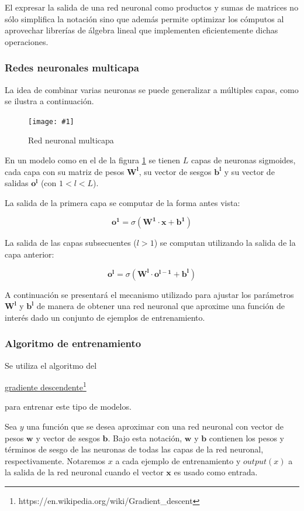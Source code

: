 \documentclass[a4paper, 10pt, twoside]{article}
\newcommand{\img}[3]{
  \begin{figure}[H]
    \begin{center}
      \texttt{[image: \#1]}
    \end{center}
    \caption{#2}
    \label{#3}
  \end{figure}
}
\newcommand{\link}[2]{
  \href{#1}{#2}\footnote{#1}
}
\begin{document}
El expresar la salida de una red neuronal como productos y sumas de matrices no
sólo simplifica la notación sino que además permite optimizar los cómputos al
aprovechar librerías de álgebra lineal que implementen eficientemente dichas
operaciones.


\subsubsection{Redes neuronales multicapa}

La idea de combinar varias neuronas se puede generalizar a múltiples capas,
como se ilustra a continuación.

\img{multilayer-neural-network.png}{Red neuronal
multicapa}{img:multilayer-neural-network}

En un modelo como en el de la figura \ref{img:multilayer-neural-network} se
tienen $L$ capas de neuronas sigmoides, cada capa con su matriz de pesos
$\bm{W^l}$, su vector de sesgos $\bm{b^l}$ y su vector de salidas $\bm{o^l}$
(con $1 < l < L$).

La salida de la primera capa se computar de la forma antes vista:

$$\bm{o^1} = \sigma(\bm{W^1} \cdot \bm{x} + \bm{b^1})$$

La salida de las capas subsecuentes ($l > 1$) se computan utilizando la salida
de la capa anterior:

$$\bm{o^l} = \sigma(\bm{W^l} \cdot \bm{o^{l-1}} + \bm{b^l})$$

A continuación se presentará el mecanismo utilizado para ajustar los parámetros
$\bm{W^l}$ y $\bm{b^l}$ de manera de obtener una red neuronal que aproxime una
función de interés dado un conjunto de ejemplos de entrenamiento.


\subsubsection{Algoritmo de entrenamiento}

Se utiliza el algoritmo del
\link{https://en.wikipedia.org/wiki/Gradient_descent}{gradiente descendente}
para entrenar este tipo de modelos.

Sea $y$ una función que se desea aproximar con una red neuronal con vector de
pesos $\bm{w}$ y vector de sesgos $\bm{b}$. Bajo esta notación, $\bm{w}$ y
$\bm{b}$ contienen los pesos y términos de sesgo de las neuronas de todas las
capas de la red neuronal, respectivamente. Notaremos $x$ a cada ejemplo de
entrenamiento y $\mathit{output}(x)$ a la salida de la red neuronal cuando el
vector $\bm{x}$ es usado como entrada.
\end{document}
